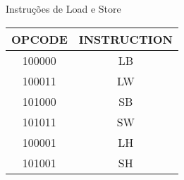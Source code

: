 Instruções de Load e Store
\begin{table}[H]
\centering 	
  	\begin{tabular}{|c|c|}
  	\hline 
  	\cellcolor[gray]{0.9}\textbf{OPCODE} & \cellcolor[gray]{0.9}\textbf{INSTRUCTION} \\ 
  	\hline 
  	100000 & LB \\ 
  	\hline 
  	100011 & LW \\ 
  	\hline 
  	101000 & SB \\ 
  	\hline 
  	101011 & SW \\ 
  	\hline 
  	100001 & LH \\ 
  	\hline
  	101001 & SH \\ 
  	\hline 
  	\end{tabular} 
\end{table}